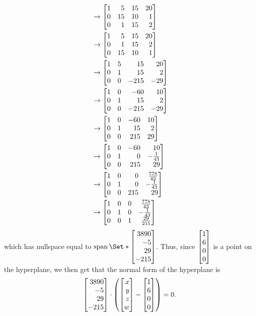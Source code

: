 \begin{exercises}
\begin{problist}
\begin{solution}
\begin{enumerate}
\begin{align*}
							&\rightarrow \mat{1&5&15&20\\0&15&10&1\\0&1&15&2}\\
							&\rightarrow \mat{1&5&15&20\\0&1&15&2\\0&15&10&1}\\
							&\rightarrow \mat{1&5&15&20\\0&1&15&2\\0&0&-215&-29}\\
							&\rightarrow \mat{1&0&-60&10\\0&1&15&2\\0&0&-215&-29}\\
							&\rightarrow \mat{1&0&-60&10\\0&1&15&2\\0&0&215&29}\\
							&\rightarrow \mat{1&0&-60&10\\0&1&0&-\frac{1}{43}\\0&0&215&29}\\
							&\rightarrow \mat{1&0&0&\frac{778}{43}\\0&1&0&-\frac{1}{43}\\0&0&215&29}\\
							&\rightarrow \mat{1&0&0&\frac{778}{43}\\0&1&0&-\frac{1}{43}\\0&0&1&\frac{29}{215}}
						\end{align*}
						which has nullspace equal to $\Span\Set*{\mat{3890\\-5\\29\\-215}}$. Thus, since $\mat{1\\6\\0\\0}$ is a point on the hyperplane, 
						we then get that the normal form of the hyperplane is \[\mat{3890\\-5\\29\\-215}\cdot\left(\mat{x\\y\\z\\w}-\mat{1\\6\\0\\0} \right)=0.\]
				\end{enumerate}
			\end{solution}	


\end{problist}
\end{exercises}
